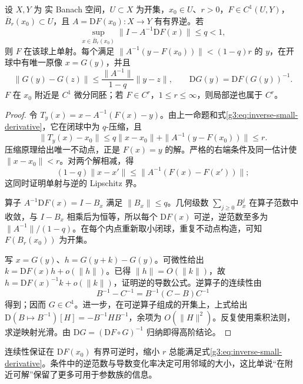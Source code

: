 \begin{theorem}[定量逆函数定理]\label{g3:thm:quantitative-banach-inverse}
	设 \(X,Y\) 为 实 Banach 空间，\(U\subset X\) 为开集，\(x_0\in U\)、\(r>0\)，\(F\in C^1(U,Y)\)，\(\overline B_r(x_0)\subset U\)，且 \(A=\mathrm DF(x_0):X\to Y\) 有有界逆。若
	\begin{equation}\label{g3:eq:inverse-small-derivative}
		\sup_{x\in\overline B_r(x_0)}
		\|I-A^{-1}\mathrm DF(x)\|\le q<1,
	\end{equation}
	则 \(F\) 在该球上单射。每个满足
	\(\|A^{-1}(y-F(x_0))\|<(1-q)r\) 的 \(y\)，在开球中有唯一原像 \(x=G(y)\)，并且
	\[
		\|G(y)-G(z)\|\le\frac{\|A^{-1}\|}{1-q}\|y-z\|,
		\qquad \mathrm DG(y)=\mathrm DF(G(y))^{-1}.
	\]
	\(F\) 在 \(x_0\) 附近是 \(C^1\) 微分同胚；若 \(F\in C^r\)，\(1\le r\le\infty\)，则局部逆也属于 \(C^r\)。
\end{theorem}
\begin{proof}
	令 \(T_y(x)=x-A^{-1}(F(x)-y)\)。由上一命题和式\eqref{g3:eq:inverse-small-derivative}，它在闭球中为 \(q\)-压缩，且
	\[
		\|T_y(x)-x_0\|
		\le q\|x-x_0\|+\|A^{-1}(y-F(x_0))\|\le r.
	\]
	压缩原理给出唯一不动点，正是 \(F(x)=y\) 的解。严格的右端条件及同一估计使 \(\|x-x_0\|<r\)。对两个解相减，得
	\[
		(1-q)\|x-x'\|\le\|A^{-1}(F(x)-F(x'))\|;
	\]
	这同时证明单射与逆的 Lipschitz 界。

	算子 \(A^{-1}\mathrm DF(x)=I-B_x\) 满足 \(\|B_x\|\le q\)。几何级数 \(\sum_{j\ge0}B_x^j\) 在算子范数中收敛，与 \(I-B_x\) 相乘后为恒等，所以每个 \(\mathrm DF(x)\) 可逆，逆范数至多为 \(\|A^{-1}\|/(1-q)\)。在每个内点重新取小闭球，重复不动点构造，可知 \(F(B_r(x_0))\) 为开集。

	写 \(x=G(y)\)、\(h=G(y+k)-G(y)\)。可微性给出
	\(k=\mathrm DF(x)h+o(\|h\|)\)。已得 \(\|h\|=O(\|k\|)\)，故
	\(h=\mathrm DF(x)^{-1}k+o(\|k\|)\)，证明逆的导数公式。逆算子的连续性由
	\[
		B^{-1}-C^{-1}=B^{-1}(C-B)C^{-1}
	\]
	得到；因而 \(G\in C^1\)。进一步，在可逆算子组成的开集上，上式给出
	\(\mathrm D(B\mapsto B^{-1})[H]=-B^{-1}HB^{-1}\)，余项为 \(O(\|H\|^2)\)。反复使用乘积法则，求逆映射光滑。由 \(\mathrm DG=(\mathrm DF\circ G)^{-1}\) 归纳即得高阶结论。
\end{proof}

连续性保证在 \(\mathrm DF(x_0)\) 有界可逆时，缩小 \(r\) 总能满足式\eqref{g3:eq:inverse-small-derivative}。条件中的逆范数与导数变化率决定可用邻域的大小，这比单说“在附近可解”保留了更多可用于参数族的信息。

